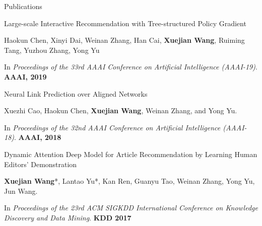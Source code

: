 \documentclass{resume} %
\begin{document}
\begin{rSection}{Publications}
\begin{rSubsection}{Large-scale Interactive Recommendation with Tree-structured Policy Gradient}{}{}{}
\item Haokun Chen, Xinyi Dai, Weinan Zhang, Han Cai, \textbf{Xuejian Wang}, Ruiming Tang, Yuzhou Zhang, Yong Yu
\item In \emph{Proceedings of the 33rd AAAI Conference on Artificial Intelligence (AAAI-19)}. \textbf{AAAI, 2019}
\end{rSubsection}
\vspace{-2pt}
\begin{rSubsection}{Neural Link Prediction over Aligned Networks}{}{}{}
\item Xuezhi Cao, Haokun Chen, \textbf{Xuejian Wang}, Weinan Zhang, and Yong Yu.
\item In \emph{Proceedings of the 32nd AAAI Conference on Artificial Intelligence (AAAI-18)}. \textbf{AAAI, 2018}
\end{rSubsection}
\vspace{-2pt}
\begin{rSubsection}{Dynamic Attention Deep Model for Article Recommendation by Learning Human Editors' Demonstration}{}{}{}
\item \textbf{Xuejian Wang}*, Lantao Yu*, Kan Ren, Guanyu Tao, Weinan Zhang, Yong Yu, Jun Wang.
\item In \emph{Proceedings of the 23rd ACM SIGKDD International Conference on Knowledge Discovery and Data Mining}. \textbf{KDD 2017}
\end{rSubsection}
\end{rSection}
\end{document}
